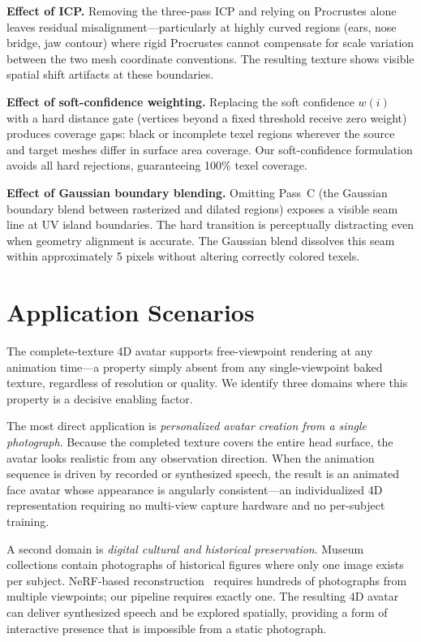 \documentclass[conference]{IEEEtran}
\begin{document}
\medskip\noindent\textbf{Effect of ICP.}
Removing the three-pass ICP and relying on Procrustes alone leaves residual
misalignment—particularly at highly curved regions (ears, nose bridge, jaw
contour) where rigid Procrustes cannot compensate for scale variation
between the two mesh coordinate conventions. The resulting texture shows visible
spatial shift artifacts at these boundaries.

\medskip\noindent\textbf{Effect of soft-confidence weighting.}
Replacing the soft confidence $w(i)$ with a hard distance gate (vertices beyond
a fixed threshold receive zero weight) produces coverage gaps: black or
incomplete texel regions wherever the source and target meshes differ in
surface area coverage. Our soft-confidence formulation avoids all hard
rejections, guaranteeing 100\% texel coverage.

\medskip\noindent\textbf{Effect of Gaussian boundary blending.}
Omitting Pass~C (the Gaussian boundary blend between rasterized and dilated
regions) exposes a visible seam line at UV island boundaries. The hard
transition is perceptually distracting even when geometry alignment is accurate.
The Gaussian blend dissolves this seam within approximately 5 pixels without
altering correctly colored texels.

\section{Application Scenarios}

The complete-texture 4D avatar supports free-viewpoint rendering at any
animation time---a property simply absent from any single-viewpoint baked
texture, regardless of resolution or quality. We identify three domains where
this property is a decisive enabling factor.

The most direct application is \emph{personalized avatar creation from a single
photograph}. Because the completed texture covers the entire head surface, the
avatar looks realistic from any observation direction. When the animation
sequence is driven by recorded or synthesized speech, the result is an animated
face avatar whose appearance is angularly consistent---an individualized 4D
representation requiring no multi-view capture hardware and no per-subject
training.

A second domain is \emph{digital cultural and historical preservation}. Museum
collections contain photographs of historical figures where only one image
exists per subject. NeRF-based reconstruction~\cite{guo2021adnerf,park2021nerfface}
requires hundreds of photographs from multiple viewpoints; our pipeline requires
exactly one. The resulting 4D avatar can deliver synthesized speech and be
explored spatially, providing a form of interactive presence that is impossible
from a static photograph.
\end{document}
